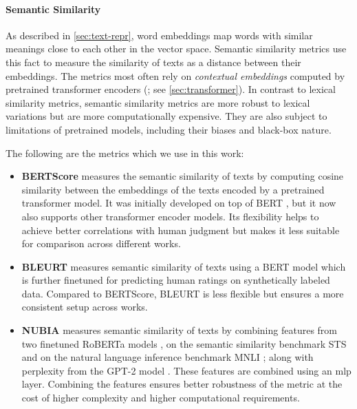 {\paragraph{Semantic Similarity} As described in \autoref{sec:text-repr}, word embeddings map words with similar meanings close to each other in the vector space. Semantic similarity metrics use this fact to measure the similarity of texts as a distance between their embeddings. The metrics most often rely on \emph{contextual embeddings} computed by pretrained transformer encoders (\citealp{peters2018deep,devlinBERTPretrainingDeep2019}; see \autoref{sec:transformer}). In contrast to lexical similarity metrics, semantic similarity metrics are more robust to lexical variations but are more computationally expensive. They are also subject to limitations of pretrained models, including their biases and black-box nature.

The following are the metrics which we use in this work:

\begin{itemize}
    \item \textbf{BERTScore} \cite{zhang2019bertscore} measures the semantic similarity of texts by computing cosine similarity between the embeddings of the texts encoded by a pretrained transformer model. It was initially developed on top of BERT \cite{devlinBERTPretrainingDeep2019}, but it now also supports other transformer encoder models. Its flexibility helps to achieve better correlations with human judgment but makes it less suitable for comparison across different works.
    \item \textbf{BLEURT} \cite{sellam2020bleurt} measures semantic similarity of texts using a BERT model \cite{devlinBERTPretrainingDeep2019} which is further finetuned for predicting human ratings on synthetically labeled data. Compared to BERTScore, BLEURT is less flexible but ensures a more consistent setup across works.
    \item \textbf{NUBIA} \cite{kaneNUBIANeUralBased2020} measures semantic similarity of texts by combining features from two finetuned RoBERTa models \cite{liuRoBERTaRobustlyOptimized2019}, on the semantic similarity benchmark STS \cite{cer-etal-2017-semeval} and on the natural language inference benchmark MNLI \cite{williams2018mnli}; along with perplexity from the GPT-2 model \cite{radford2019language}. These features are combined using an \ac{mlp} layer. Combining the features ensures better robustness of the metric at the cost of higher complexity and higher computational requirements.
\end{itemize}

}
